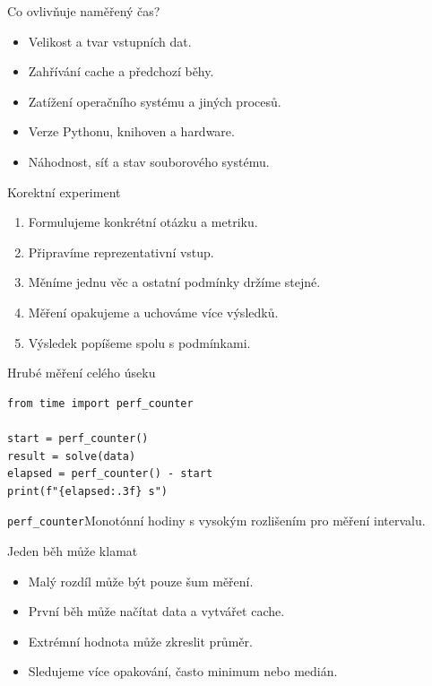\documentclass[aspectratio=169]{beamer}
\begin{document}
\begin{frame}{Co ovlivňuje naměřený čas?}
\begin{itemize}
\item Velikost a tvar vstupních dat.
\item Zahřívání cache a předchozí běhy.
\item Zatížení operačního systému a jiných procesů.
\item Verze Pythonu, knihoven a hardware.
\item Náhodnost, síť a stav souborového systému.
\end{itemize}
\end{frame}

\begin{frame}{Korektní experiment}
\begin{enumerate}
\item Formulujeme konkrétní otázku a metriku.
\item Připravíme reprezentativní vstup.
\item Měníme jednu věc a ostatní podmínky držíme stejné.
\item Měření opakujeme a uchováme více výsledků.
\item Výsledek popíšeme spolu s podmínkami.
\end{enumerate}
\end{frame}

\begin{frame}[fragile]{Hrubé měření celého úseku}
\begin{lstlisting}[style=python]
from time import perf_counter

start = perf_counter()
result = solve(data)
elapsed = perf_counter() - start
print(f"{elapsed:.3f} s")
\end{lstlisting}
\begin{block}{\texttt{perf\_counter}}Monotónní hodiny s vysokým rozlišením pro měření intervalu.\end{block}
\end{frame}

\begin{frame}{Jeden běh může klamat}
\begin{itemize}
\item Malý rozdíl může být pouze šum měření.
\item První běh může načítat data a vytvářet cache.
\item Extrémní hodnota může zkreslit průměr.
\item Sledujeme více opakování, často minimum nebo medián.
\end{itemize}
\end{frame}
\end{document}
